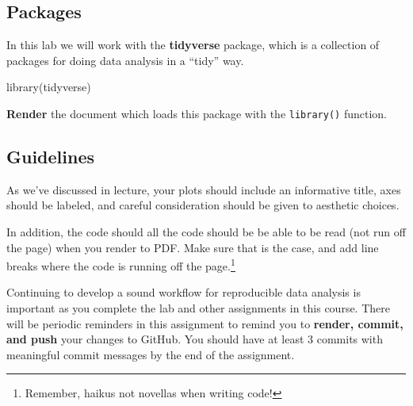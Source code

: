 \documentclass[
  letterpaper,
  DIV=11,
  numbers=noendperiod]{scrartcl}
\newenvironment{Shaded}{\begin{snugshade}}{\end{snugshade}}
\newcommand{\FunctionTok}[1]{\textcolor[rgb]{0.28,0.35,0.67}{#1}}
\newcommand{\NormalTok}[1]{\textcolor[rgb]{0.00,0.23,0.31}{#1}}
\begin{document}
\subsection{Packages}\label{packages}

In this lab we will work with the \textbf{tidyverse} package, which is a
collection of packages for doing data analysis in a ``tidy'' way.

\begin{Shaded}
\begin{Highlighting}[]
\FunctionTok{library}\NormalTok{(tidyverse)}
\end{Highlighting}
\end{Shaded}

\textbf{Render} the document which loads this package with the
\texttt{library()} function.

\subsection{Guidelines}\label{guidelines}

As we've discussed in lecture, your plots should include an informative
title, axes should be labeled, and careful consideration should be given
to aesthetic choices.

In addition, the code should all the code should be be able to be read
(not run off the page) when you render to PDF. Make sure that is the
case, and add line breaks where the code is running off the
page.\footnote{Remember, haikus not novellas when writing code!}

\begin{tcolorbox}[enhanced jigsaw, toptitle=1mm, bottomrule=.15mm, colbacktitle=quarto-callout-note-color!10!white, colframe=quarto-callout-note-color-frame, leftrule=.75mm, breakable, toprule=.15mm, colback=white, arc=.35mm, coltitle=black, left=2mm, opacitybacktitle=0.6, bottomtitle=1mm, opacityback=0, title=\textcolor{quarto-callout-note-color}{\faInfo}\hspace{0.5em}{Note}, titlerule=0mm, rightrule=.15mm]

Continuing to develop a sound workflow for reproducible data analysis is
important as you complete the lab and other assignments in this course.
There will be periodic reminders in this assignment to remind you to
\textbf{render, commit, and push} your changes to GitHub. You should
have at least 3 commits with meaningful commit messages by the end of
the assignment.

\end{tcolorbox}
\end{document}
